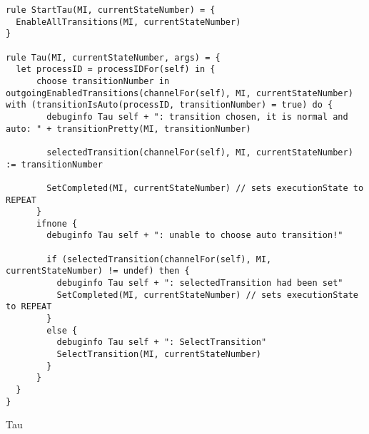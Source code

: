 \begin{listing}[H]
\begin{verbatim}
rule StartTau(MI, currentStateNumber) = {
  EnableAllTransitions(MI, currentStateNumber)
}

rule Tau(MI, currentStateNumber, args) = {
  let processID = processIDFor(self) in {
      choose transitionNumber in outgoingEnabledTransitions(channelFor(self), MI, currentStateNumber) with (transitionIsAuto(processID, transitionNumber) = true) do {
        debuginfo Tau self + ": transition chosen, it is normal and auto: " + transitionPretty(MI, transitionNumber)

        selectedTransition(channelFor(self), MI, currentStateNumber) := transitionNumber

        SetCompleted(MI, currentStateNumber) // sets executionState to REPEAT
      }
      ifnone {
        debuginfo Tau self + ": unable to choose auto transition!"

        if (selectedTransition(channelFor(self), MI, currentStateNumber) != undef) then {
          debuginfo Tau self + ": selectedTransition had been set"
          SetCompleted(MI, currentStateNumber) // sets executionState to REPEAT
        }
        else {
          debuginfo Tau self + ": SelectTransition"
          SelectTransition(MI, currentStateNumber)
        }
      }
  }
}
\end{verbatim}
\caption{Tau}
\label{lst:asm:Tau}
\end{listing}




